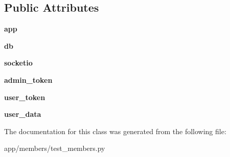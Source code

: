 \subsection*{Public Attributes}
\begin{DoxyCompactItemize}
\item 
\mbox{\label{classapp_1_1members_1_1test__members_1_1_test_members_a71416f7ad75d7fa25b6e47205e94a091}} 
{\bfseries app}
\item 
\mbox{\label{classapp_1_1members_1_1test__members_1_1_test_members_ab078e4c4ebb845aba5d4bda87b8b61f9}} 
{\bfseries db}
\item 
\mbox{\label{classapp_1_1members_1_1test__members_1_1_test_members_a153d230b4719a2d61714b74c9068489a}} 
{\bfseries socketio}
\item 
\mbox{\label{classapp_1_1members_1_1test__members_1_1_test_members_a81655defbacfef2107651bf99e7570f0}} 
{\bfseries admin\+\_\+token}
\item 
\mbox{\label{classapp_1_1members_1_1test__members_1_1_test_members_a70c6e7f6f45ee38a2227574f2b9963e7}} 
{\bfseries user\+\_\+token}
\item 
\mbox{\label{classapp_1_1members_1_1test__members_1_1_test_members_a3c54ef7c588dd1dbc75a229dbbef3731}} 
{\bfseries user\+\_\+data}
\end{DoxyCompactItemize}


The documentation for this class was generated from the following file\+:\begin{DoxyCompactItemize}
\item 
app/members/test\+\_\+members.\+py\end{DoxyCompactItemize}
